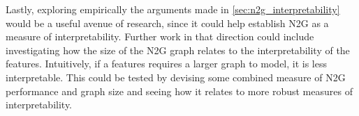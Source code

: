 Lastly, exploring empirically the arguments made in \autoref{sec:n2g_interpretability} would be a useful avenue of research, since it could help establish \ac{N2G} as a measure of interpretability.
Further work in that direction could include investigating how the size of the \ac{N2G} graph relates to the interpretability of the features.
Intuitively, if a features requires a larger graph to model, it is less interpretable.
This could be tested by devising some combined measure of \ac{N2G} performance and graph size and seeing how it relates to more robust measures of interpretability.
